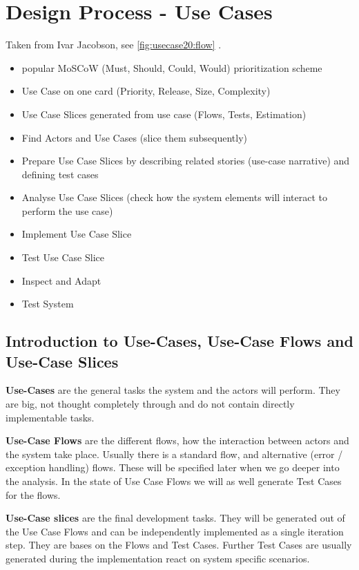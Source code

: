 {\color{gray}
\section{Design Process - Use Cases}
Taken from Ivar Jacobson, see \autoref{fig:usecase20:flow} \cite{jacobson2011usecase}.
\begin{itemize}
	\item popular MoSCoW (Must, Should, Could, Would) prioritization scheme
	\item Use Case on one card (Priority, Release, Size, Complexity)
	\item Use Case Slices generated from use case (Flows, Tests, Estimation)
	\item Find Actors and Use Cases (slice them subsequently)
	\item Prepare Use Case Slices by describing related stories (use-case narrative) and defining test cases
	\item Analyse Use Case Slices (check how the system elements will interact to perform the use case)
	\item Implement Use Case Slice
	\item Test Use Case Slice
	\item Inspect and Adapt
	\item Test System
\end{itemize}

\subsection{Introduction to Use-Cases, Use-Case Flows and Use-Case Slices}

\textbf{Use-Cases} are the general tasks the system and the actors will perform. They are big, not thought completely through and do not contain directly implementable tasks.

\textbf{Use-Case Flows} are the different flows, how the interaction between actors and the system take place. Usually there is a standard flow, and alternative (error / exception handling) flows. These will be specified later when we go deeper into the analysis. In the state of Use Case Flows we will as well generate Test Cases for the flows. 

\textbf{Use-Case slices} are the final development tasks. They will be generated out of the Use Case Flows and can be independently implemented as a single iteration step. They are bases on the Flows and Test Cases. Further Test Cases are usually generated during the implementation react on system specific scenarios.


}
